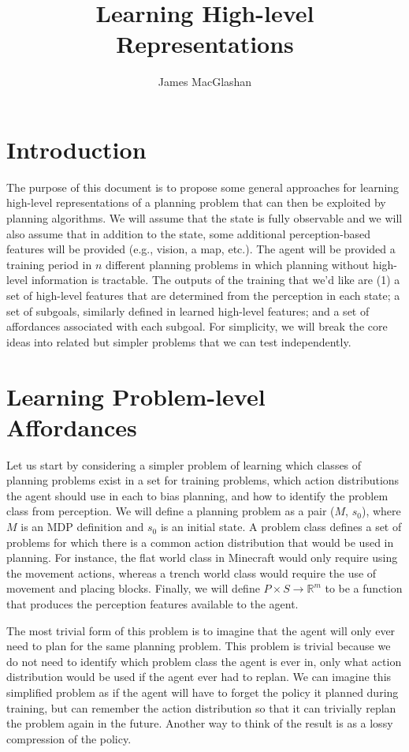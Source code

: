 \documentclass{article}
\title{Learning High-level Representations}
\author{James MacGlashan}
\date{}
\begin{document}
\maketitle
\section{Introduction}
The purpose of this document is to propose some general approaches for learning high-level representations of a planning problem that can then be exploited by planning algorithms. We will assume that the state is fully observable and we will also assume that in addition to the state, some additional perception-based features will be provided (e.g., vision, a map, etc.). The agent will be provided
a training period in $n$ different planning problems in which planning without high-level information
is tractable. The outputs of the training that we'd like are (1) a set of high-level features that are determined from the perception in each state; a set of subgoals, similarly defined in learned high-level features; and a set of affordances associated with each subgoal. For simplicity, we will break the core ideas into related but simpler problems that we can test independently.

\section{Learning Problem-level Affordances}
Let us start by considering a simpler problem of learning which classes of planning problems exist in a set for training problems, which action distributions the agent should use in each to bias planning, and how to identify the problem class from perception. We will define a planning problem as a pair ($M$, $s_0$), where $M$ is an MDP definition and $s_0$ is an initial state. A problem class defines a set of problems for which there is a common action distribution that would be used in planning. For instance, the flat world class in Minecraft would only require using the movement actions, whereas a trench world class would require the use of movement and placing blocks. Finally, we will define $P \times S \rightarrow \mathbb{R}^m$ to be a function that produces the perception features available to the agent.

The most trivial form of this problem is to imagine that the agent will only ever need to plan for the same planning problem. This problem is trivial because we do not need to identify which problem class the agent is ever in, only what action distribution would be used if the agent ever had to replan. We can imagine this simplified problem as if the agent will have to forget the policy it planned during training, but can remember the action distribution so that it can trivially replan the problem again in the future. Another way to think of the result is as a lossy compression of the policy. 
\end{document}
